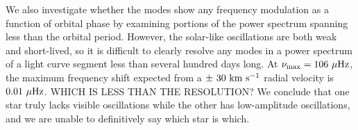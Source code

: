 We also investigate whether the modes show any frequency modulation as a function of orbital phase by examining portions of the power spectrum spanning less than the orbital period. However, the solar-like oscillations are both weak and short-lived, so it is difficult to clearly resolve any modes in a power spectrum of a light curve segment less than several hundred days long. At $\nu_{\rm{max}} = 106 \ \mu \rm{Hz}$, the maximum frequency shift expected from a $\pm \ 30 \ \rm{km} \ \rm{s}^{-1}$ radial velocity is $0.01 \ \mu \rm{Hz}$. WHICH IS LESS THAN THE RESOLUTION? We conclude that one star truly lacks visible oscillations while the other has low-amplitude oscillations, and we are unable to definitively say which star is which.